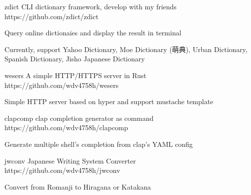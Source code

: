
\begin{cvopensources}

  \cvopensource
    {zdict}   %
    {CLI dictionary framework, develop with my friends}  %
    {https://github.com/zdict/zdict}
    {
      \begin{cvitems}   %
        \item {Query online dictionaies and display the result in terminal}
        \item {Currently, support Yahoo Dictionary, Moe Dictionary (萌典), Urban Dictionary, Spanish Dictionary, Jisho Japanese Dictionary}
      \end{cvitems}
    }

  \cvopensource
    {wesers}   %
    {A simple HTTP/HTTPS server in Rust}  %
    {https://github.com/wdv4758h/wesers}
    {
      \begin{cvitems}
        \item {Simple HTTP server based on hyper and support mustache template}
      \end{cvitems}
    }

  \cvopensource
    {clapcomp}   %
    {clap completion generator as command}  %
    {https://github.com/wdv4758h/clapcomp}
    {
      \begin{cvitems}
      \item {Generate multiple shell's completion from clap's YAML config}
      \end{cvitems}
    }

  \cvopensource
    {jwconv}   %
    {Japanese Writing System Converter}  %
    {https://github.com/wdv4758h/jwconv}
    {
      \begin{cvitems}
        \item {Convert from Romanji to Hiragana or Katakana}
      \end{cvitems}
    }


\end{cvopensources}
